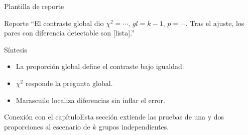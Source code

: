 \documentclass[10pt,aspectratio=169]{beamer}
\begin{document}
\begin{frame}{Plantilla de reporte}\small\begin{block}{Reporte} ``El contraste global dio $\chi^2=\cdots$, $gl=k-1$, $p=\cdots$. Tras el ajuste, los pares con diferencia detectable son [lista].''\end{block}\end{frame}
\begin{frame}{Síntesis}\small\begin{itemize}\item La proporción global define el contraste bajo igualdad.\item $\chi^2$ responde la pregunta global.\item Marascuilo localiza diferencias sin inflar el error.\end{itemize}\end{frame}
\begin{frame}{Conexión con el capítulo}\small Esta sección extiende las pruebas de una y dos proporciones al escenario de $k$ grupos independientes.\end{frame}
\end{document}
